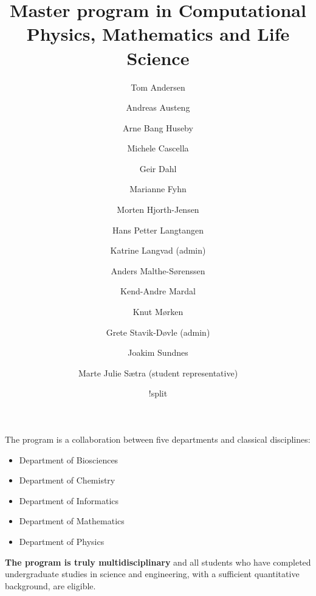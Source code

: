 \documentclass{beamer}
\begin{document}







\title{Master program in Computational Physics, Mathematics and Life Science}


\author{Tom Andersen
\and
Andreas Austeng
\and
Arne Bang Huseby
\and
Michele Cascella
\and
Geir Dahl
\and
Marianne Fyhn
\and
Morten Hjorth-Jensen
\and
Hans Petter Langtangen
\and
Katrine Langvad (admin)
\and
Anders Malthe-Sørenssen
\and
Kend-Andre Mardal
\and
Knut Mørken
\and
Grete Stavik-Døvle (admin)
\and
Joakim Sundnes
\and
Marte Julie Sætra (student representative)}


\date{!split
}


\begin{block}{}

The program is a collaboration between five departments and classical disciplines:

\begin{itemize}
 \item Department of Biosciences

 \item Department of Chemistry

 \item Department of Informatics

 \item Department of Mathematics

 \item Department of Physics
\end{itemize}

\noindent
\textbf{The program is truly multidisciplinary} and all students who have completed
undergraduate studies in science and engineering, with a sufficient
quantitative background, are eligible.  

\end{block}
\end{document}
